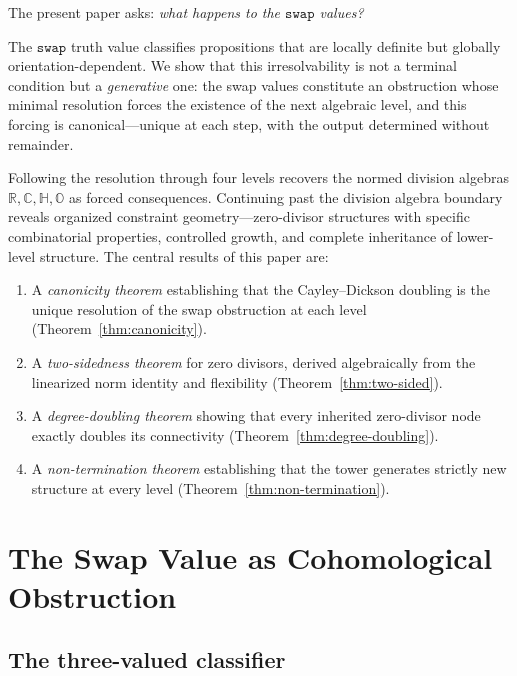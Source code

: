 \documentclass[12pt,a4paper]{article}
\theoremstyle{definition}
\theoremstyle{remark}
\newcommand{\R}{\mathbb{R}}
\newcommand{\C}{\mathbb{C}}
\newcommand{\HH}{\mathbb{H}}
\newcommand{\OO}{\mathbb{O}}
\newcommand{\swap}{\mathtt{swap}}
\begin{document}
The present paper asks: \emph{what happens to the $\swap$ values?}

The $\swap$ truth value classifies propositions that are locally
definite but globally orientation-dependent. We show that this
irresolvability is not a terminal condition but a \emph{generative}
one: the swap values constitute an obstruction whose minimal
resolution forces the existence of the next algebraic level, and
this forcing is canonical---unique at each step, with the output
determined without remainder.

Following the resolution through four levels recovers the normed
division algebras $\R, \C, \HH, \OO$ as forced consequences.
Continuing past the division algebra boundary reveals organized
constraint geometry---zero-divisor structures with specific
combinatorial properties, controlled growth, and complete
inheritance of lower-level structure. The central results of this
paper are:

\begin{enumerate}[label=(\arabic*), nosep]
  \item A \emph{canonicity theorem} establishing that the
  Cayley--Dickson doubling is the unique resolution of the swap
  obstruction at each level (Theorem~\ref{thm:canonicity}).
  \item A \emph{two-sidedness theorem} for zero divisors,
  derived algebraically from the linearized norm identity and
  flexibility (Theorem~\ref{thm:two-sided}).
  \item A \emph{degree-doubling theorem} showing that every
  inherited zero-divisor node exactly doubles its connectivity
  (Theorem~\ref{thm:degree-doubling}).
  \item A \emph{non-termination theorem} establishing that the
  tower generates strictly new structure at every level
  (Theorem~\ref{thm:non-termination}).
\end{enumerate}


\section{The Swap Value as Cohomological Obstruction}
\label{sec:swap-obstruction}

\subsection{The three-valued classifier}
\end{document}
